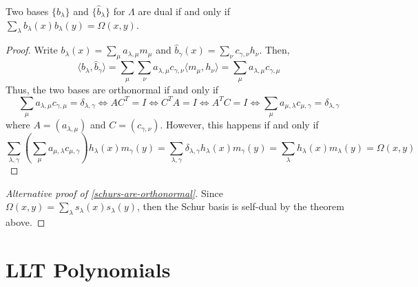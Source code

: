 \documentclass[11pt,leqno,oneside]{amsart}
\numberwithin{thm}{section}
\newcommand{\sym}{\Lambda}
\begin{document}
\begin{thm}
  Two bases \(\{b_\lambda\}\) and \(\{\hat{b}_\lambda\}\) for \(\sym\) are
  dual if and only if \(\sum_{\lambda} b_\lambda(x) b_\lambda(y) =
  \Omega(x,y)\). 
\end{thm}
\begin{proof}
  Write \(b_\lambda(x) = \sum_{\mu} a_{\lambda, \mu} m_\mu\)
    and \(\hat{b}_{\gamma}(x) = \sum_\nu c_{\gamma,\nu}
    h_\nu\). Then, \[
      \langle b_\lambda,\hat{b}_\gamma \rangle = \sum_{\mu} \sum_{\nu}
      a_{\lambda,\mu} c_{\gamma, \nu} \langle m_\mu, h_\nu \rangle =
      \sum_{\mu} a_{\lambda,\mu} c_{\gamma, \mu}
    \]
    Thus, the two bases are orthonormal if and only if \[
      \sum_{\mu} a_{\lambda,\mu} c_{\gamma, \mu} = \delta_{\lambda,
        \gamma} \iff AC^T = I \iff C^TA = I \iff A^TC = I \iff
      \sum_{\mu} a_{\mu,\lambda} c_{\mu, \gamma} = \delta_{\lambda,\gamma}
    \]
    where \(A = (a_{\lambda,\mu})\) and \(C = (c_{\gamma,\nu})\).
    However, this happens if and only if \[
      \sum_{\lambda,\gamma} \left(\sum_{\mu} a_{\mu,\lambda} c_{\mu,
         \gamma}\right) 
      h_{\lambda}(x) m_{\gamma}(y) = \sum_{\lambda,\gamma}
      \delta_{\lambda,\gamma} h_\lambda(x) m_{\gamma}(y) =
      \sum_{\lambda}
      h_{\lambda}(x) m_{\lambda}(y) = \Omega(x,y)
    \]
\end{proof}
\begin{proof}[Alternative proof of \ref{schurs-are-orthonormal}]
  Since \(\Omega(x,y) = \sum_{\lambda} s_\lambda(x) s_{\lambda}(y)\),
  then the Schur basis is self-dual by the theorem above.
\end{proof}
\section{LLT Polynomials}
\end{document}
